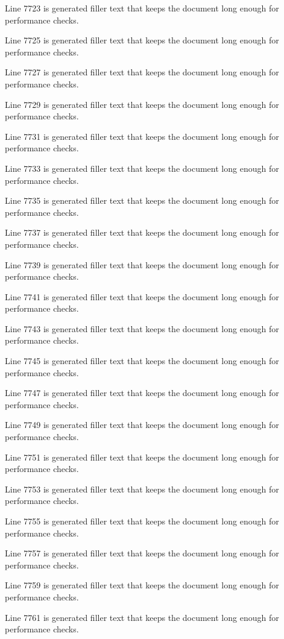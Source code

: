 Line 7723 is generated filler text that keeps the document long enough for performance checks.

Line 7725 is generated filler text that keeps the document long enough for performance checks.

Line 7727 is generated filler text that keeps the document long enough for performance checks.

Line 7729 is generated filler text that keeps the document long enough for performance checks.

Line 7731 is generated filler text that keeps the document long enough for performance checks.

Line 7733 is generated filler text that keeps the document long enough for performance checks.

Line 7735 is generated filler text that keeps the document long enough for performance checks.

Line 7737 is generated filler text that keeps the document long enough for performance checks.

Line 7739 is generated filler text that keeps the document long enough for performance checks.

Line 7741 is generated filler text that keeps the document long enough for performance checks.

Line 7743 is generated filler text that keeps the document long enough for performance checks.

Line 7745 is generated filler text that keeps the document long enough for performance checks.

Line 7747 is generated filler text that keeps the document long enough for performance checks.

Line 7749 is generated filler text that keeps the document long enough for performance checks.

Line 7751 is generated filler text that keeps the document long enough for performance checks.

Line 7753 is generated filler text that keeps the document long enough for performance checks.

Line 7755 is generated filler text that keeps the document long enough for performance checks.

Line 7757 is generated filler text that keeps the document long enough for performance checks.

Line 7759 is generated filler text that keeps the document long enough for performance checks.

Line 7761 is generated filler text that keeps the document long enough for performance checks.


